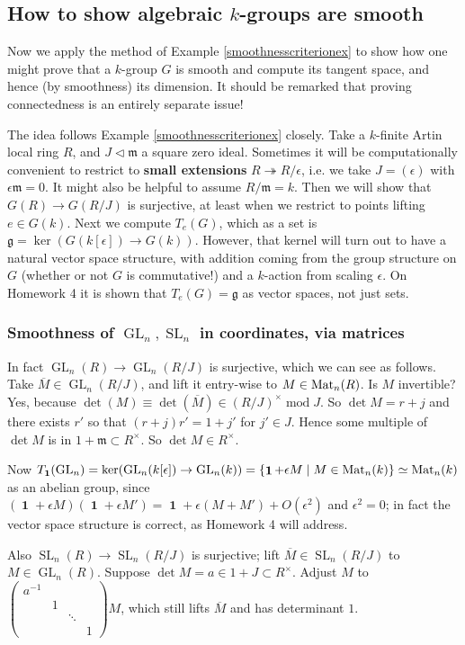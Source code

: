 \documentclass[10pt]{article}
\newcommand{\nsg}{\vartriangleleft}
\newcommand{\GL}{\operatorname{GL}}
\newcommand{\SL}{\operatorname{SL}}
\renewcommand{\(}{\left(}
\renewcommand{\)}{\right)}
\renewcommand{\bar}{\overline}
\DeclareMathOperator{\id}{\mathbf{1}}
\renewcommand{\mod}{\operatorname{mod}}
\newcommand{\m}{\backslash}
\newcommand{\onto}{\twoheadrightarrow }
\renewcommand{\m}{\mathfrak{m}}
\newcommand{\g}{\mathfrak{g}}
\numberwithin{thm}{subsection}
\begin{document}
\subsection{How to show algebraic $k$-groups are smooth}
Now we apply the method of Example \ref{smoothnesscriterionex}
to show how one might prove that a $k$-group $G$ is smooth
and
compute its tangent space, and hence (by smoothness)
its dimension.
It should be remarked that proving connectedness is an entirely separate issue!

The idea follows Example \ref{smoothnesscriterionex} closely.
Take a $k$-finite Artin local ring $R$,
and $J\nsg \m$ a square zero ideal.
Sometimes it will be computationally convenient to restrict to \textbf{small extensions} $R\onto R/\epsilon$, i.e. we take $J=(\epsilon)$ with $\epsilon\m=0$.
It might also be helpful to assume $R/\m=k$.
Then we will show that $G(R)\to G(R/J)$ is surjective, at least when we restrict
to points lifting $e\in G(k)$.
Next we compute $T_e(G)$, which as a set
is $\g=\ker(G(k[\epsilon])\to G(k))$.
However, that kernel will turn out to have a natural vector space
structure, with addition coming from the group structure on $G$
(whether or not $G$ is commutative!)
and a $k$-action from scaling $\epsilon$.
On Homework 4 it is shown that $T_e(G)=\g$ as vector spaces,
not just sets.

\subsubsection{Smoothness of $\GL_n,\SL_n$ in coordinates,  via matrices}
In fact $\GL_n(R)\to \GL_n(R/J)$ is surjective, which we can see as follows.
Take $\bar M\in \GL_n(R/J)$, and lift it entry-wise
to $M\in {\rm{Mat}}_n(R)$.
Is $M$ invertible?
Yes, because $\det(M)\equiv \det(\bar M)\in (R/J)^\times\mod J$.
So $\det M = r+j$ 
and there exists $r'$ so that $(r+j)r'=1+j'$ for $j'\in J$.
Hence some multiple of $\det M$ is in $1+\m\subset R^\times$.
So $\det M\in R^\times$.

Now $T_{\id}(\GL_n)=\ker(\GL_n(k[\epsilon])\to \GL_n(k))
=\{\id +\epsilon M\mid M\in {\rm{Mat}}_n(k)\}\simeq {\rm{Mat}}_n(k)$
as an abelian group,
since $(\id+\epsilon M)(\id+\epsilon M')=\id +\epsilon(M+M')+O(\epsilon^2)$
and $\epsilon^2=0$; in fact the vector space structure is correct, as Homework 4 will address.

Also $\SL_n(R)\to\SL_n(R/J)$ is surjective;
lift $\bar M\in \SL_n(R/J)$ to $M\in \GL_n(R)$.
Suppose $\det M = a\in 1+J\subset R^\times$.
Adjust $M$ to $\(\begin{smallmatrix}a^{-1}&&&\\&1&&\\&&\ddots&\\&&&1\end{smallmatrix}\)M$, which still lifts $\bar M$
and has determinant $1$.
\end{document}
